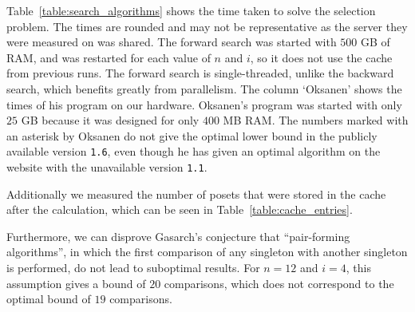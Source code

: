 \documentclass[10pt,journal,compsoc]{IEEEtran}
\begin{document}
Table~\ref{table:search_algorithms} shows the time taken to solve the selection problem.
The times are rounded and may not be representative as the server they were measured on was shared.
The forward search was started with $500$ GB of RAM, and was restarted for each value of $n$ and $i$, so it does not use the cache from previous runs.
The forward search is single-threaded, unlike the backward search, which benefits greatly from parallelism.
The column `Oksanen' shows the times of his program \cite{Oksanen} on our hardware.
Oksanen's program was started with only $25$ GB because it was designed for only $400$ MB RAM.
The numbers marked with an asterisk by Oksanen do not give the optimal lower bound in the publicly available version \texttt{1.6}, even though he has given an optimal algorithm on the website with the unavailable version \texttt{1.1}.

Additionally we measured the number of posets that were stored in the cache after the calculation, which can be seen in Table~\ref{table:cache_entries}.

Furthermore, we can disprove Gasarch's \cite{Gasarch1996} conjecture that ``pair-forming algorithms'', in which the first comparison of any singleton with another singleton is performed, do not lead to suboptimal results.
For $n = 12$ and $i = 4$, this assumption gives a bound of $20$ comparisons, which does not correspond to the optimal bound of $19$ comparisons.
\end{document}
